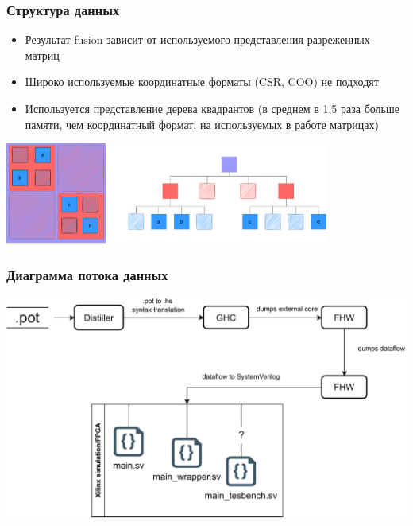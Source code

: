 \documentclass[xcolor=table,aspectratio=169]{beamer}
\begin{document}
\begin{frame}[fragile] \frametitle{Структура данных}

    \begin{itemize}
        \item Результат fusion зависит от используемого представления разреженных матриц
        \vfill
        \item Широко используемые координатные форматы (CSR, COO) не подходят
        \vfill
        \item Используется представление дерева квадрантов (в среднем в \textcolor{codepurple}{1{,}5} раза больше памяти, чем координатный формат, на используемых в работе матрицах)
    \end{itemize}
    
\vspace{1cm}


  
\centering

\includegraphics[width=0.8\textwidth]{pictures/qtree_horizontal.pdf}

\end{frame}


\begin{frame}[fragile] \frametitle{Диаграмма потока данных}

\centering
\includegraphics[height=0.8\textheight]{pictures/arch.drawio (4).pdf}

\end{frame}
\end{document}
